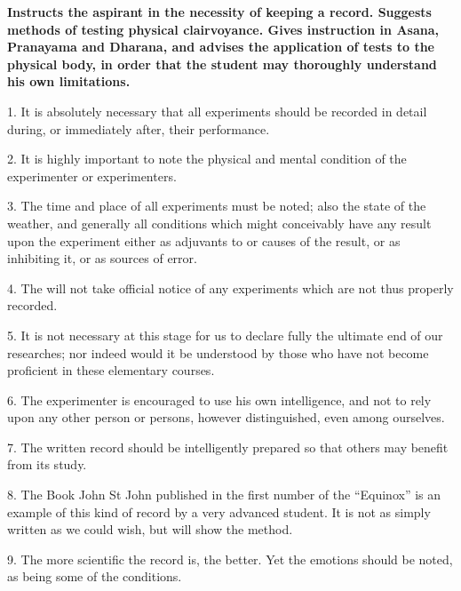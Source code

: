 \textbf{Instructs the aspirant in the necessity of keeping a record. Suggests methods of testing physical clairvoyance. Gives instruction in Asana, Pranayama and Dharana, and advises the application of tests to the physical body, in order that the student may thoroughly understand his own limitations.}



1. It is absolutely necessary that all experiments should be recorded in detail during, or immediately after, their performance.

2. It is highly important to note the physical and mental condition of the experimenter or experimenters.

3. The time and place of all experiments must be noted; also the state of the weather, and generally all conditions which might conceivably have any result upon the experiment either as adjuvants to or causes of the result, or as inhibiting it, or as sources of error.

4. The \Argentium{} will not take official notice of any experiments which are not thus properly recorded.

5. It is not necessary at this stage for us to declare fully the ultimate end of our researches; nor indeed would it be understood by those who have not become proficient in these elementary courses.

6. The experimenter is encouraged to use his own intelligence, and not to rely upon any other person or persons, however distinguished, even among ourselves.

7. The written record should be intelligently prepared so that others may benefit from its study.

8. The Book John St John published in the first number of the \enquote{Equinox} is an example of this kind of record by a very advanced student. It is not as simply written as we could wish, but will show the method.

9. The more scientific the record is, the better. Yet the emotions should be noted, as being some of the conditions.

